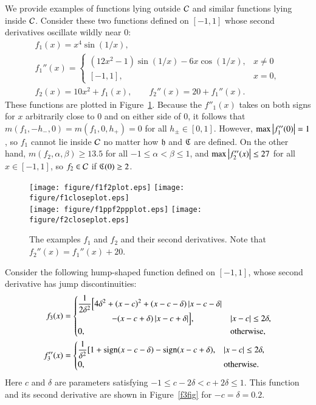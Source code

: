 \documentclass[review]{elsarticle}
\theoremstyle{definition}
\begin{document}
We provide examples of functions lying outside $\mathcal{C}$
and similar functions lying inside $\mathcal{C}$. Consider these two functions defined
on $[-1,1]$ whose second derivatives oscillate wildly near $0$:
\begin{gather*}
f_1(x) = x^4 \sin(1/x), \\
 f_1''(x) = \begin{cases} (12x^2 - 1) \sin(1/x) -6 x \cos(1/x), & x \ne 0 \\
 [-1,1], & x = 0, \end{cases} \\
f_2(x) = 10  x^2 + f_1(x), \qquad f_2''(x) = 20+ f_1''(x).
\end{gather*}
These functions are plotted in Figure~\ref{f1f2fig}. Because the $f''_1(x)$
takes on both signs for $x$ arbitrarily close to $0$ and on either side of $0$,
it follows that  $m(f_1,-h_-,0) = m(f_1,0,h_+) = 0$ for all $h_\pm \in [0,1]$.
However, $\max\left \lvert f''_1(0) \right \rvert = 1$, so $f_1$ cannot lie inside
$\mathcal{C}$ no matter how $\mathfrak{h}$ and $\mathfrak{C}$ are defined. On the other hand,
$m(f_2,\alpha, \beta) \ge 13.5$ for all $-1 \le \alpha < \beta \le 1$, and
$\max \left \lvert f''_2(x) \right \rvert \le 27$ for all $x \in [-1,1]$, so $f_2 \in
\mathcal{C}$ if $\mathfrak{C}(0) \ge 2$.

\begin{figure}[t]
\centering
\texttt{[image: figure/f1f2plot.eps]} \quad
\texttt{[image: figure/f1closeplot.eps]} \\
\texttt{[image: figure/f1ppf2ppplot.eps]} \quad
\texttt{[image: figure/f2closeplot.eps]}
\caption{The examples $f_1$ and $f_2$ and their second derivatives. Note that
$f_2''(x) = f_1''(x) + 20$. \label{f1f2fig}}
\end{figure}

Consider the following hump-shaped function defined on $[-1,1]$, whose second derivative has jump discontinuities:
\begin{align} \label{f3def}
f_3(x) & = \begin{cases} \displaystyle
   \frac{1}{2\delta^2} \Bigl [4 \delta^2 + (x-c)^2 + (x-c-\delta)\left \lvert x-c-\delta \right \rvert
\\ \qquad \qquad
    - (x-c+\delta)\left \lvert x-c+\delta \right \rvert \Bigr ], & \left \lvert x-c \right \rvert \le 2\delta,
\\ 0, & \text{otherwise},
\end{cases} \\
\nonumber
f''_3(x) & =
\begin{cases} \displaystyle
    \frac{1}{\delta^2} [1 + \operatorname{sign}(x-c-\delta) - \operatorname{sign}(x-c+\delta), & \left \lvert x-c \right \rvert \le 2\delta,
\\ 0, & \text{otherwise}.
\end{cases}
\end{align}
Here $c$ and $\delta$ are parameters satisfying $-1 \le c-2 \delta < c+ 2\delta \le 1$. This function and its second derivative
are shown in Figure~\ref{f3fig} for $-c=\delta = 0.2$.
\end{document}
